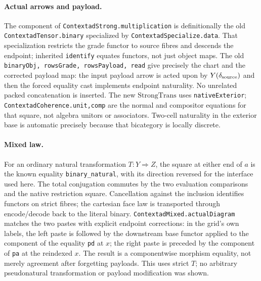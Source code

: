 \documentclass{article}
\begin{document}
\paragraph{Actual arrows and payload.}
The component of \texttt{ContextadStrong.multiplication} is definitionally the old \texttt{ContextadTensor.binary} specialized by \texttt{ContextadSpecialize.data}. That specialization restricts the grade functor to source fibres and descends the endpoint; inherited \texttt{identify} equates functors, not just object maps. The old \texttt{binaryObj, rowsGrade, rowsPayload, read} give precisely the chart and the corrected payload map: the input payload arrow is acted upon by $Y(\delta_{\rm source})$ and then the forced equality cast implements endpoint naturality. No unrelated packed concatenation is inserted. The new $\mathrm{StrongTrans}$ uses \texttt{nativeExterior}; \texttt{ContextadCoherence.unit,comp} are the normal and compositor equations for that square, not algebra unitors or associators. Two-cell naturality in the exterior base is automatic precisely because that bicategory is locally discrete.
\paragraph{Mixed law.}
For an ordinary natural transformation $T:Y\Rightarrow Z$, the square at either end of $a$ is the known equality \texttt{binary\_natural}, with its direction reversed for the interface used here. The total conjugation commutes by the two evaluation comparisons and the native restriction square. Cancellation against the inclusion identifies functors on strict fibres; the cartesian face law is transported through encode/decode back to the literal binary. \texttt{ContextadMixed.actualDiagram} matches the two pastes with explicit endpoint corrections: in the grid's own labels, the left paste is followed by the downstream base functor applied to the component of the equality \texttt{pd} at $x$; the right paste is preceded by the component of \texttt{pa} at the reindexed $x$. The result is a componentwise morphism equality, not merely agreement after forgetting payloads. This uses strict $T$; no arbitrary pseudonatural transformation or payload modification was shown.
\end{document}
